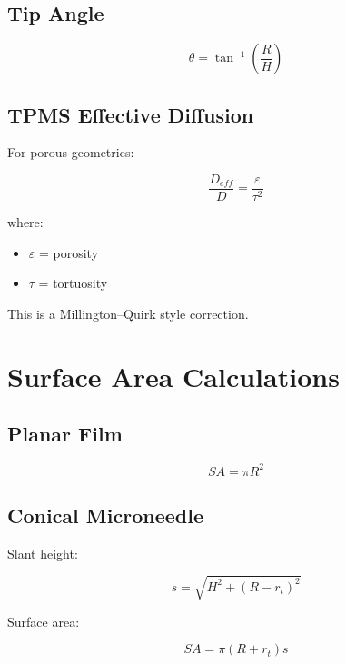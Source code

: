 \documentclass[11pt]{article}
\begin{document}
\subsection{Tip Angle}

\begin{equation}
\theta =
\tan^{-1}\left(\frac{R}{H}\right)
\end{equation}

\subsection{TPMS Effective Diffusion}

For porous geometries:

\begin{equation}
\frac{D_{eff}}{D}
=
\frac{\varepsilon}{\tau^2}
\end{equation}

where:

\begin{itemize}
\item $\varepsilon$ = porosity
\item $\tau$ = tortuosity
\end{itemize}

This is a Millington--Quirk style correction.

\section{Surface Area Calculations}

\subsection{Planar Film}

\begin{equation}
SA = \pi R^2
\end{equation}

\subsection{Conical Microneedle}

Slant height:

\begin{equation}
s=\sqrt{H^2+(R-r_t)^2}
\end{equation}

Surface area:

\begin{equation}
SA=\pi(R+r_t)s
\end{equation}
\end{document}
